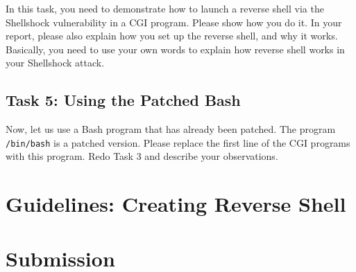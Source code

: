 In this task, you need to demonstrate 
how to launch a reverse shell via the Shellshock vulnerability in a CGI program. 
Please show how you do it. In your report, please also explain 
how you set up the reverse shell, and why it works. Basically, you need to
use your own words to explain how reverse shell works in your Shellshock
attack. 


\subsection{Task 5: Using the Patched Bash}

Now, let us use a Bash program that has already been patched.
The program \texttt{/bin/bash} is a patched version.
Please replace the first line of 
the CGI programs with this program. 
Redo Task 3 and describe your observations. 


\section{Guidelines: Creating Reverse Shell}
\label{shellshock:sec:reverseshell}








\section{Submission}






